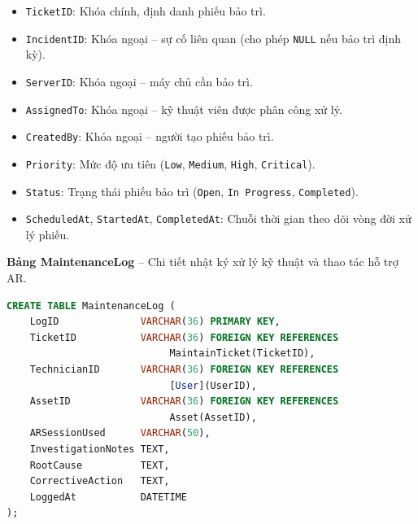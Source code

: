 \begin{itemize}[leftmargin=2em]
    \item \texttt{TicketID}: Khóa chính, định danh phiếu bảo trì.
    \item \texttt{IncidentID}: Khóa ngoại -- sự cố liên quan (cho phép \texttt{NULL} nếu bảo trì định kỳ).
    \item \texttt{ServerID}: Khóa ngoại -- máy chủ cần bảo trì.
    \item \texttt{AssignedTo}: Khóa ngoại -- kỹ thuật viên được phân công xử lý.
    \item \texttt{CreatedBy}: Khóa ngoại -- người tạo phiếu bảo trì.
    \item \texttt{Priority}: Mức độ ưu tiên (\texttt{Low}, \texttt{Medium}, \texttt{High}, \texttt{Critical}).
    \item \texttt{Status}: Trạng thái phiếu bảo trì (\texttt{Open}, \texttt{In Progress}, \texttt{Completed}).
    \item \texttt{ScheduledAt}, \texttt{StartedAt}, \texttt{CompletedAt}: Chuỗi thời gian theo dõi vòng đời xử lý phiếu.
\end{itemize}

\vspace{0.5em}
\noindent\textbf{Bảng MaintenanceLog} -- Chi tiết nhật ký xử lý kỹ thuật và thao tác hỗ trợ AR.

\begin{tcolorbox}[colback=gray!5, colframe=gray!60, title={\textbf{CREATE TABLE MaintenanceLog}}, fonttitle=\bfseries\small, boxrule=0.5pt, arc=2pt]
\begin{lstlisting}[language=SQL, basicstyle=\ttfamily\small, breaklines=true, showstringspaces=false, keywordstyle=\bfseries\color{blue!70!black}, stringstyle=\color{red!70!black}, commentstyle=\itshape\color{green!50!black}]
CREATE TABLE MaintenanceLog (
    LogID              VARCHAR(36) PRIMARY KEY,
    TicketID           VARCHAR(36) FOREIGN KEY REFERENCES
                            MaintainTicket(TicketID),
    TechnicianID       VARCHAR(36) FOREIGN KEY REFERENCES
                            [User](UserID),
    AssetID            VARCHAR(36) FOREIGN KEY REFERENCES
                            Asset(AssetID),
    ARSessionUsed      VARCHAR(50),
    InvestigationNotes TEXT,
    RootCause          TEXT,
    CorrectiveAction   TEXT,
    LoggedAt           DATETIME
);
\end{lstlisting}
\end{tcolorbox}

